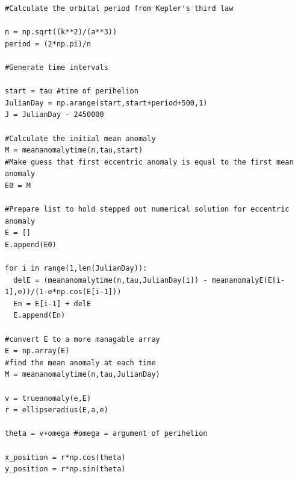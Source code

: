 \documentclass[a4paper,12pt]{article}
\begin{document}
\begin{appendices}
\footnotesize\begin{verbatim}
#Calculate the orbital period from Kepler's third law

n = np.sqrt((k**2)/(a**3)) 
period = (2*np.pi)/n

#Generate time intervals

start = tau #time of perihelion
JulianDay = np.arange(start,start+period+500,1)
J = JulianDay - 2450000

#Calculate the initial mean anomaly
M = meananomalytime(n,tau,start)
#Make guess that first eccentric anomaly is equal to the first mean anomaly
E0 = M

#Prepare list to hold stepped out numerical solution for eccentric anomaly
E = []
E.append(E0)

for i in range(1,len(JulianDay)):
  delE = (meananomalytime(n,tau,JulianDay[i]) - meananomalyE(E[i-1],e))/(1-e*np.cos(E[i-1]))
  En = E[i-1] + delE
  E.append(En)

#convert E to a more managable array
E = np.array(E)
#find the mean anomaly at each time
M = meananomalytime(n,tau,JulianDay)

v = trueanomaly(e,E)
r = ellipseradius(E,a,e)

theta = v+omega #omega = argument of perihelion

x_position = r*np.cos(theta)
y_position = r*np.sin(theta)
\end{verbatim}
\normalsize

\end{appendices}
\end{document}
